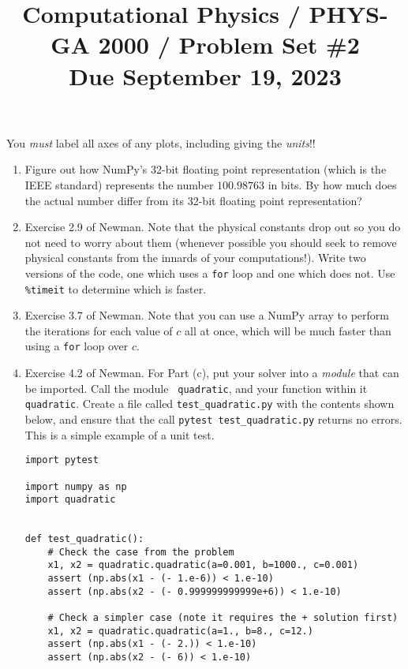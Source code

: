 \documentclass[11pt, preprint]{aastex}
\begin{document}
\title{\bf Computational Physics / PHYS-GA 2000 / Problem Set \#2
\\ Due September 19, 2023 }

You {\it must} label all axes of any plots, including giving the {\it
  units}!!

\begin{enumerate}

  \item Figure out how NumPy's 32-bit floating point representation
    (which is the IEEE standard) represents the number $100.98763$ in
    bits. By how much does the actual number differ from its 32-bit
    floating point representation?

  \item Exercise 2.9 of Newman. Note that the physical constants drop
    out so you do not need to worry about them (whenever possible you
    should seek to remove physical constants from the innards of your
    computations!).  Write two versions of the code, one which uses a
    {\tt for} loop and one which does not.  Use {\tt \%timeit} to
    determine which is faster.

  \item Exercise 3.7 of Newman.  Note that you can use a NumPy array
    to perform the iterations for each value of $c$ all at once, which
    will be much faster than using a {\tt for} loop over $c$.

  \item Exercise 4.2 of Newman. For Part (c), put your solver into a
    {\it module} that can be imported. Call the module {\tt
      quadratic}, and your function within it {\tt quadratic}. Create
    a file called {\tt test\_quadratic.py} with the contents shown
    below, and ensure that the call {\tt pytest test\_quadratic.py}
    returns no errors. This is a simple example of a unit test.
\begin{verbatim}
import pytest

import numpy as np
import quadratic


def test_quadratic():
    # Check the case from the problem
    x1, x2 = quadratic.quadratic(a=0.001, b=1000., c=0.001)
    assert (np.abs(x1 - (- 1.e-6)) < 1.e-10)
    assert (np.abs(x2 - (- 0.999999999999e+6)) < 1.e-10)

    # Check a simpler case (note it requires the + solution first)
    x1, x2 = quadratic.quadratic(a=1., b=8., c=12.)
    assert (np.abs(x1 - (- 2.)) < 1.e-10)
    assert (np.abs(x2 - (- 6)) < 1.e-10)
\end{verbatim}

\end{enumerate}
\end{document}
